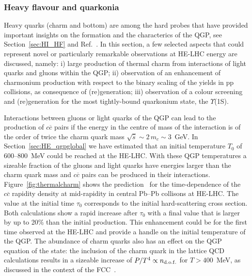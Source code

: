 \documentclass[../report.tex]{subfiles}
\begin{document}
\subsubsection{Heavy flavour and quarkonia}
\label{sec:HE_hf}


Heavy quarks (charm and bottom) are among the hard probes that have
provided important insights on the formation and the characterics of
the QGP, see Section~\ref{sec:HI_HF} and Ref.~\cite{Andronic:2015wma}.
In this section,
a few selected aspects that could
represent novel or particularly remarkable observations at HE-LHC
energy are discussed,
namely: i) large production of thermal charm from
  interactions of light quarks and gluons within the QGP;
ii) observation of an enhancement of charmonium production with
  respect to the binary scaling of the yields in pp collisions, as
  consequence of (re)generation;
iii) observation of a colour screening and (re)generation for the most tightly-bound
  quarkonium state, the $\Upsilon$(1S).

Interactions between gluons or light quarks of the QGP can lead to the
production of $c\overline c$ pairs if the energy in the centre of mass 
of the interaction is of the order of twice the charm quark mass
$\sqrt{\hat s}\sim 2\,m_c\sim 3$~GeV. 
In Section~\ref{sec:HE_qgpglobal} we have estimated 
that an initial temperature $T_0$ of 600--800~MeV could be
reached at the HE-LHC. 
With these QGP temperatures a sizeable fraction of the gluons and
light quarks have energies larger than the charm quark mass 
and $c\overline c$ pairs can be produced in their interactions. 
Figure~\ref{fig:thermalcharm} shows the prediction~\cite{Liu:2016zle} for the time-dependence of the $c\overline c$
rapidity density at mid-rapidity in central Pb--Pb collisons at HE-LHC. The value at the initial time
$\tau_0$ corresponds to the initial hard-scattering cross section.
Both calculations show a rapid increase
after $\tau_0$ with a final value that is larger by up to 20\% than
the initial production. 
This enhancement could be for the first time observed at the HE-LHC
and provide a handle on the initial
temperature of the QGP. 
The abundance of charm quarks also has an effect on the QGP equation
of the state: 
the inclusion of the charm quark in the lattice QCD calculations results in a sizeable 
increase of $P/T^4 \propto n_{\rm d.o.f.}$ for $T>400$~MeV, as
discussed in the context of the FCC~\cite{Dainese:2016gch}.  
\end{document}
